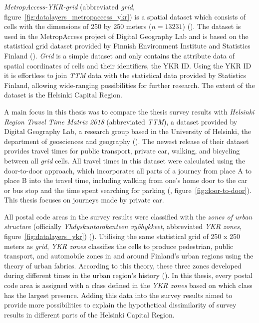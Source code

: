 \textit{MetropAccess-YKR-grid} (abbreviated \textit{grid}, figure~\ref{fig:datalayers_metropaccess_ykr}) is a spatial dataset which consists of cells with the dimensions of 250 by 250 meters ($n=13231$) (\cite{Toivonen2014a}). The dataset is used in the MetropAccess project of Digital Geography Lab and is based on the statistical grid dataset provided by Finnish Environment Institute and Statistics Finland (\cite{StatisticsFinland2020}). \textit{Grid} is a simple dataset and only contains the attribute data of spatial coordinates of cells and their identifiers, the YKR ID. Using the YKR ID it is effortless to join \textit{TTM} data with the statistical data provided by Statistics Finland, allowing wide-ranging possibilities for further research. The extent of the dataset is the Helsinki Capital Region.

A main focus in this thesis was to compare the thesis survey results with \textit{Helsinki Region Travel Time Matrix 2018} (abbreviated \textit{TTM}), a dataset provided by Digital Geography Lab, a research group based in the University of Helsinki, the department of geosciences and geography (\cite{Tenkanen2018}). The newest release of their dataset provides travel times for public transport, private car, walking, and bicycling between all \textit{grid} cells. All travel times in this dataset were calculated using the door-to-door approach, which incorporates all parts of a journey from place A to place B into the travel time, including walking from one's home door to the car or bus stop and the time spent searching for parking (\cite{Salonen2013}, figure~\ref{fig:door-to-door}). This thesis focuses on journeys made by private car.

All postal code areas in the survey results were classified with the \textit{zones of urban structure} (officially \textit{Yhdyskuntarakenteen vyöhykkeet}, abbreviated \textit{YKR zones}, figure~\ref{fig:datalayers_ykr}) (\cite{Ristimaki2017}). Utilising the same statistical grid of 250 x 250 meters as \textit{grid}, \textit{YKR zones} classifies the cells to produce pedestrian, public transport, and automobile zones in and around Finland's urban regions using the theory of urban fabrics. According to this theory, these three zones developed during different times in the urban region's history (\cite{Newman2016}). In this thesis, every postal code area is assigned with a class defined in the \textit{YKR zones} based on which class has the largest presence. Adding this data into the survey results aimed to provide more possibilities to explain the hypothetical dissimilarity of survey results in different parts of the Helsinki Capital Region.

